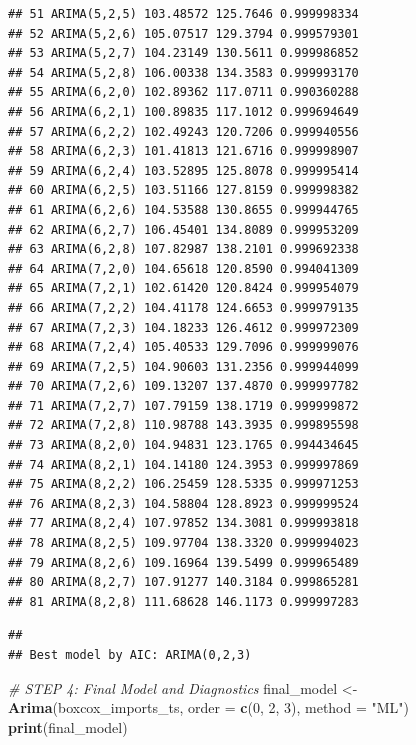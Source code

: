 \documentclass[
]{article}
\newenvironment{Shaded}{\begin{snugshade}}{\end{snugshade}}
\newcommand{\AttributeTok}[1]{\textcolor[rgb]{0.13,0.29,0.53}{#1}}
\newcommand{\CommentTok}[1]{\textcolor[rgb]{0.56,0.35,0.01}{\textit{#1}}}
\newcommand{\DecValTok}[1]{\textcolor[rgb]{0.00,0.00,0.81}{#1}}
\newcommand{\FunctionTok}[1]{\textcolor[rgb]{0.13,0.29,0.53}{\textbf{#1}}}
\newcommand{\NormalTok}[1]{#1}
\newcommand{\OtherTok}[1]{\textcolor[rgb]{0.56,0.35,0.01}{#1}}
\newcommand{\SpecialCharTok}[1]{\textcolor[rgb]{0.81,0.36,0.00}{\textbf{#1}}}
\newcommand{\StringTok}[1]{\textcolor[rgb]{0.31,0.60,0.02}{#1}}
\begin{document}
\begin{verbatim}
## 51 ARIMA(5,2,5) 103.48572 125.7646 0.999998334
## 52 ARIMA(5,2,6) 105.07517 129.3794 0.999579301
## 53 ARIMA(5,2,7) 104.23149 130.5611 0.999986852
## 54 ARIMA(5,2,8) 106.00338 134.3583 0.999993170
## 55 ARIMA(6,2,0) 102.89362 117.0711 0.990360288
## 56 ARIMA(6,2,1) 100.89835 117.1012 0.999694649
## 57 ARIMA(6,2,2) 102.49243 120.7206 0.999940556
## 58 ARIMA(6,2,3) 101.41813 121.6716 0.999998907
## 59 ARIMA(6,2,4) 103.52895 125.8078 0.999995414
## 60 ARIMA(6,2,5) 103.51166 127.8159 0.999998382
## 61 ARIMA(6,2,6) 104.53588 130.8655 0.999944765
## 62 ARIMA(6,2,7) 106.45401 134.8089 0.999953209
## 63 ARIMA(6,2,8) 107.82987 138.2101 0.999692338
## 64 ARIMA(7,2,0) 104.65618 120.8590 0.994041309
## 65 ARIMA(7,2,1) 102.61420 120.8424 0.999954079
## 66 ARIMA(7,2,2) 104.41178 124.6653 0.999979135
## 67 ARIMA(7,2,3) 104.18233 126.4612 0.999972309
## 68 ARIMA(7,2,4) 105.40533 129.7096 0.999999076
## 69 ARIMA(7,2,5) 104.90603 131.2356 0.999944099
## 70 ARIMA(7,2,6) 109.13207 137.4870 0.999997782
## 71 ARIMA(7,2,7) 107.79159 138.1719 0.999999872
## 72 ARIMA(7,2,8) 110.98788 143.3935 0.999895598
## 73 ARIMA(8,2,0) 104.94831 123.1765 0.994434645
## 74 ARIMA(8,2,1) 104.14180 124.3953 0.999997869
## 75 ARIMA(8,2,2) 106.25459 128.5335 0.999971253
## 76 ARIMA(8,2,3) 104.58804 128.8923 0.999999524
## 77 ARIMA(8,2,4) 107.97852 134.3081 0.999993818
## 78 ARIMA(8,2,5) 109.97704 138.3320 0.999994023
## 79 ARIMA(8,2,6) 109.16964 139.5499 0.999965489
## 80 ARIMA(8,2,7) 107.91277 140.3184 0.999865281
## 81 ARIMA(8,2,8) 111.68628 146.1173 0.999997283
\end{verbatim}

\begin{Shaded}
\end{Shaded}

\begin{verbatim}
## 
## Best model by AIC: ARIMA(0,2,3)
\end{verbatim}

\begin{Shaded}
\begin{Highlighting}[]
\CommentTok{\# STEP 4: Final Model and Diagnostics}
\NormalTok{final\_model }\OtherTok{\textless{}{-}} \FunctionTok{Arima}\NormalTok{(boxcox\_imports\_ts, }\AttributeTok{order =} \FunctionTok{c}\NormalTok{(}\DecValTok{0}\NormalTok{, }\DecValTok{2}\NormalTok{, }\DecValTok{3}\NormalTok{), }\AttributeTok{method =} \StringTok{"ML"}\NormalTok{)}
\FunctionTok{print}\NormalTok{(final\_model)}
\end{Highlighting}
\end{Shaded}
\end{document}
